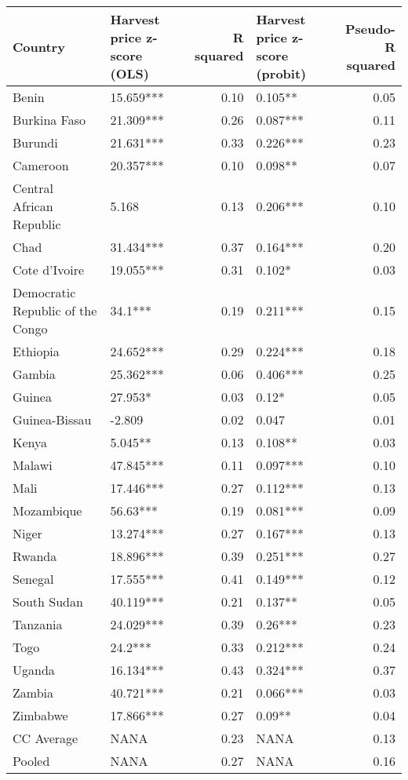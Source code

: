 \begin{table}[ht]
\centering
\begin{tabular}{llrlr}
  \hline
Country & Harvest price z-score (OLS) & R squared & Harvest price z-score (probit) & Pseudo-R squared \\ 
  \hline
Benin & 15.659*** & 0.10 & 0.105**  & 0.05 \\ 
  Burkina Faso & 21.309*** & 0.26 & 0.087*** & 0.11 \\ 
  Burundi & 21.631*** & 0.33 & 0.226*** & 0.23 \\ 
  Cameroon & 20.357*** & 0.10 & 0.098**  & 0.07 \\ 
  Central African Republic & 5.168  & 0.13 & 0.206*** & 0.10 \\ 
  Chad & 31.434*** & 0.37 & 0.164*** & 0.20 \\ 
  Cote d'Ivoire & 19.055*** & 0.31 & 0.102*  & 0.03 \\ 
  Democratic Republic of the Congo & 34.1*** & 0.19 & 0.211*** & 0.15 \\ 
  Ethiopia & 24.652*** & 0.29 & 0.224*** & 0.18 \\ 
  Gambia & 25.362*** & 0.06 & 0.406*** & 0.25 \\ 
  Guinea & 27.953*  & 0.03 & 0.12*  & 0.05 \\ 
  Guinea-Bissau & -2.809  & 0.02 & 0.047  & 0.01 \\ 
  Kenya & 5.045**  & 0.13 & 0.108**  & 0.03 \\ 
  Malawi & 47.845*** & 0.11 & 0.097*** & 0.10 \\ 
  Mali & 17.446*** & 0.27 & 0.112*** & 0.13 \\ 
  Mozambique & 56.63*** & 0.19 & 0.081*** & 0.09 \\ 
  Niger & 13.274*** & 0.27 & 0.167*** & 0.13 \\ 
  Rwanda & 18.896*** & 0.39 & 0.251*** & 0.27 \\ 
  Senegal & 17.555*** & 0.41 & 0.149*** & 0.12 \\ 
  South Sudan & 40.119*** & 0.21 & 0.137**  & 0.05 \\ 
  Tanzania & 24.029*** & 0.39 & 0.26*** & 0.23 \\ 
  Togo & 24.2*** & 0.33 & 0.212*** & 0.24 \\ 
  Uganda & 16.134*** & 0.43 & 0.324*** & 0.37 \\ 
  Zambia & 40.721*** & 0.21 & 0.066*** & 0.03 \\ 
  Zimbabwe & 17.866*** & 0.27 & 0.09**  & 0.04 \\ 
  CC Average & NANA & 0.23 & NANA & 0.13 \\ 
  Pooled & NANA & 0.27 & NANA & 0.16 \\ 
   \hline
\end{tabular}
\end{table}
